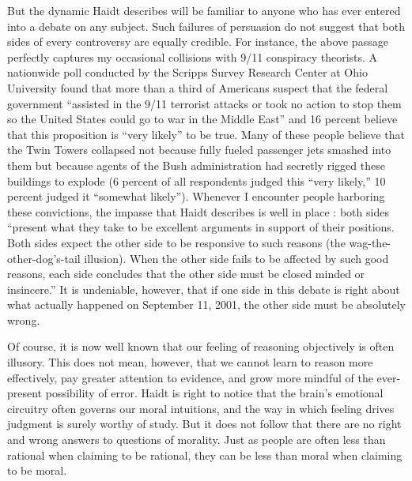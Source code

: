 \documentclass[a4paper,14pt]{extarticle}
\begin{document}
But the dynamic Haidt describes will be familiar to anyone who has ever entered into a debate on any subject.
Such failures of persuasion do not suggest that both sides of every controversy are equally credible.
For instance, the above passage perfectly captures my occasional collisions with 9/11 conspiracy theorists.
A nationwide poll conducted by the Scripps Survey Research Center at Ohio University found that more than a third of Americans suspect that the federal government ``assisted in the 9/11 terrorist attacks or took no action to stop them so the United States could go to war in the Middle East'' and 16 percent believe that this proposition is ``very likely'' to be true.
Many of these people believe that the Twin Towers collapsed not because fully fueled passenger jets smashed into them but because agents of the Bush administration had secretly rigged these buildings to explode (6 percent of all respondents judged this ``very likely,'' 10 percent judged it ``somewhat likely'').
Whenever I encounter people harboring these convictions, the impasse that Haidt describes is well in place :
both sides ``present what they take to be excellent arguments in support of their positions.
Both sides expect the other side to be responsive to such reasons (the wag-the-other-dog's-tail illusion).
When the other side fails to be affected by such good reasons, each side concludes that the other side must be closed minded or insincere.''
It is undeniable, however, that if one side in this debate is right about what actually happened on September 11, 2001, the other side must be absolutely wrong.

Of course, it is now well known that our feeling of reasoning objectively is often illusory.
This does not mean, however, that we cannot learn to reason more effectively, pay greater attention to evidence, and grow more mindful of the ever-present possibility of error.
Haidt is right to notice that the brain's emotional circuitry often governs our moral intuitions, and the way in which feeling drives judgment is surely worthy of study.
But it does not follow that there are no right and wrong answers to questions of morality.
Just as people are often less than rational when claiming to be rational, they can be less than moral when claiming to be moral.
\end{document}

